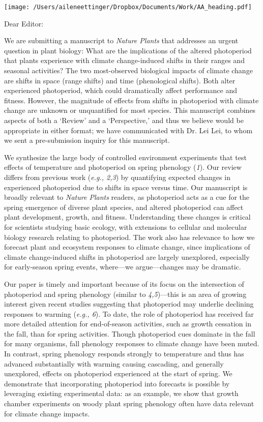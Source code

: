 \documentclass[10.5pt,a4paper]{letter}
\begin{document}
\begin{letter}{}
\texttt{[image: /Users/aileneettinger/Dropbox/Documents/Work/AA\_heading.pdf]}

\opening{Dear Editor:}
We are submitting a manuscript to \emph{Nature Plants} that addresses an urgent question in plant biology: What are the implications
of the altered photoperiod that plants experience with climate change-induced shifts in their ranges and seasonal activities? The two most-observed biological impacts of climate change are shifts in space (range shifts) and time (phenological shifts). Both alter experienced photoperiod, which could dramatically affect performance and fitness. However, the magnitude of effects from shifts in photoperiod with climate change are unknown or unquantified for most species. This manuscript combines aspects of both a `Review' and a `Perspective,' and thus we believe would be appropriate in either format; we have communicated with Dr. Lei Lei, to whom we sent a pre-submission inquiry for this manuscript. 
\par We synthesize the large body of controlled environment experiments that test effects of temperature and photoperiod on spring phenology (\emph{1}). Our review differs from previous work  (\emph{e.g., 2,3}) by quantifying expected changes in experienced photoperiod due to shifts in space versus time. Our manuscript is  broadly relevant to \emph{Nature Plants} readers, as photoperiod acts as a cue for the spring emergence of diverse plant species, and altered photoperiod can affect plant development, growth, and fitness. Understanding these changes is critical for scientists studying basic ecology, with extensions to cellular and molecular biology research relating to photoperiod. The work also has relevance to how we forecast plant and ecosystem responses to climate change, since implications of climate change-induced shifts in photoperiod are largely unexplored, especially for early-season spring events, where---we argue---changes may be dramatic.

\par Our paper is timely and important because of its focus on the intersection of photoperiod and spring phenology (similar to \emph{4,5})---this is an area of growing interest given recent studies suggesting that photoperiod may underlie declining responses to warming (\emph{e.g., 6}). To date, the role of photoperiod has received far more detailed attention for end-of-season activities, such as growth cessation in the fall, than for spring activities. Though photoperiod cues dominate in the fall for many organisms, fall phenology responses to climate change have been muted. In contrast, spring phenology responds strongly to temperature and thus has advanced substantially with warming causing cascading, and generally unexplored, effects on photoperiod experienced at the start of spring. We demonstrate that incorporating photoperiod into forecasts is possible by leveraging existing experimental data: as an example, we show that growth chamber experiments on woody plant spring phenology often have data relevant for climate change impacts. 


\end{letter}
\end{document}
